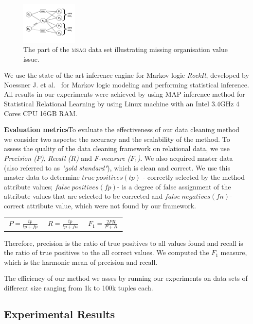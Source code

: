 \begin{figure}[t]
    \centering
    \includegraphics[width=0.25\textwidth, trim = 0mm 4mm 0mm 5mm, clip]{img/graph01.png}
    \caption{The part of the \textsc{msag} data set illustrating missing organisation value issue.}
    \label{fig:msagmissing}
\end{figure}

We use the state-of-the-art inference engine for Markov logic \textit{RockIt}, developed by Noessner J. et al.~\cite{NoessnerNS13} for Markov logic modeling and performing statistical inference. All results in our experiments were achieved by using MAP inference method for Statistical Relational Learning by using Linux machine with an Intel 3.4GHz 4 Cores CPU 16GB RAM.

\textbf{Evaluation metrics}To evaluate the effectiveness of our data cleaning method we consider two aspects: the accuracy and the scalability of the method. To assess the quality of the data cleaning framework on relational data, we use \textit{Precision ($P$)}, \textit{Recall ($R$)} and \textit{F-measure ($F_1$)}. We also acquired master data (also referred to as \textit{"gold standard"}), which is clean and correct. We use this master data to determine $true~positives (tp)$ - correctly selected by the method attribute values; $false~positives (fp)$- is a degree of false assignment of the attribute values that are selected to be corrected and $false~negatives (fn)$- correct attribute value, which were not found by our framework.

\begin{tabular}{ l l l }
$~P=\frac{tp}{tp+fp}~$ & $~R=\frac{tp}{tp+fn}~$ & $~F_1=\frac{2PR}{P+R}~$ \\
\end{tabular}

Therefore, precision is the ratio of true positives to all values found and recall is the ratio of true positives to the all correct values. We computed the $F_1$ measure, which is the harmonic mean of precision and recall.

The efficiency of our method we asses by running our experiments on data sets of different size ranging from 1k to 100k tuples each.

\subsection{Experimental Results} 

